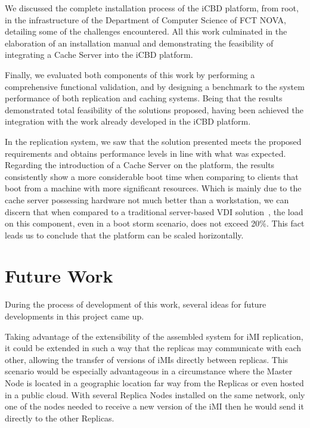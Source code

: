 We discussed the complete installation process of the iCBD platform, from root, in the infrastructure of the Department of Computer Science of FCT NOVA, detailing some of the challenges encountered. All this work culminated in the elaboration of an installation manual and demonstrating the feasibility of integrating a Cache Server into the iCBD platform.

Finally, we evaluated both components of this work by performing a comprehensive functional validation, and by designing a benchmark to the system performance of both replication and caching systems. Being that the results demonstrated total feasibility of the solutions proposed, having been achieved the integration with the work already developed in the iCBD platform. 

In the replication system, we saw that the solution presented meets the proposed requirements and obtains performance levels in line with what was expected. Regarding the introduction of a Cache Server on the platform, the results consistently show a more considerable boot time when comparing to clients that boot from a machine with more significant resources. Which is mainly due to the cache server possessing hardware not much better than a workstation, we can discern that when compared to a traditional server-based VDI solution~\cite{Lopes2017_presentation}, the load on this component, even in a boot storm scenario, does not exceed 20\%. This fact leads us to conclude that the platform can be scaled horizontally.


\section{Future Work}
\label{sec:con_future_work}

During the process of development of this work, several ideas for future developments in this project came up.

Taking advantage of the extensibility of the assembled system for iMI replication, it could be extended in such a way that the replicas may communicate with each other, allowing the transfer of versions of iMIs directly between replicas. This scenario would be especially advantageous in a circumstance where the Master Node is located in a geographic location far way from the Replicas or even hosted in a public cloud. With several Replica Nodes installed on the same network, only one of the nodes needed to receive a new version of the iMI then he would send it directly to the other Replicas.


